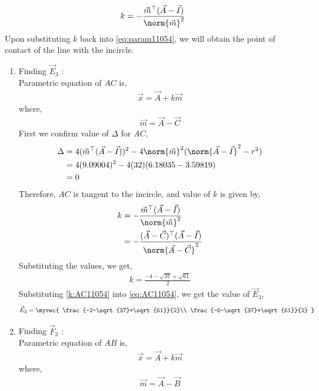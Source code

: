 \documentclass[journal,12pt,twocolumn]{IEEEtran}
\theoremstyle{remark}
\begin{document}
\begin{align}
	k = -\frac{\vec{m}^{\top}(\vec{A} - \vec{I})}{\norm{\vec{m}}^2} \label{eq:k11054}
\end{align}
Upon substituting $k$ back into \eqref{eq:param11054}, we will obtain the point of contact of the line with the incircle.
\begin{enumerate}
	\item Finding $\vec{E}_3$ :\\
		Parametric equation of $AC$ is,
		\begin{align}
			\vec{x} = \vec{A} + k\vec{m} \label{eq:AC11054}
		\end{align}
		where,
		\begin{align}
			\vec{m} = \vec{A} - \vec{C}
		\end{align}	
		First we confirm value of $\Delta$ for $AC$,
		\begin{align}
			\Delta &= 4(\vec{m}^{\top}(\vec{A}-\vec{I}))^2 - 4\norm{\vec{m}}^2(\norm{\vec{A}-\vec{I}}^2 - r^2)\\	
			&= 4(9.09004)^2 - 4(32)(6.18035-3.59819) \\
			&= 0
		\end{align}
		Therefore, $AC$ is tangent to the incircle, and value of $k$ is given by, 
		\begin{align}
			k &= -\frac{\vec{m}^{\top}(\vec{A} - \vec{I})}{\norm{\vec{m}}^2} \\
			&= -\frac{(\vec{A}-\vec{C})^{\top}(\vec{A} - \vec{I})}{\norm{\vec{A}-\vec{C}}^2}
		\end{align}
		Substituting the values, we get,
		\begin{align}
			k = \frac{-4-\sqrt{37}+\sqrt{61}}{2} \label{k:AC11054} 
		\end{align}
		Substituting \eqref{k:AC11054} into \eqref{eq:AC11054}, we get the value of $\vec{E}_3$,
		\begin{align}
			\vec{E}_3 = \myvec{
				\frac{-2-\sqrt{37}+\sqrt{61}}{2}\\ 
				\frac{-6-\sqrt{37}+\sqrt{61}}{2}
			}
		\end{align}
	\item Finding $\vec{F}_3$ :\\
		Parametric equation of $AB$ is,
		\begin{align}
			\vec{x} = \vec{A} + k\vec{m} \label{eq:AB11054}
		\end{align}
		where,
		\begin{align}
			\vec{m} = \vec{A} - \vec{B}
		\end{align}	

\end{enumerate}
\end{document}
